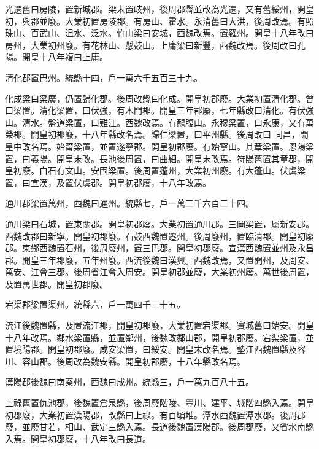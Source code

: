 \begin{pinyinscope}
 光遷舊曰房陵，置新城郡。梁末置岐州，後周郡縣並改為光遷，又有舊綏州，開皇初，與郡並廢。大業初置房陵郡。有房山、霍水。永清舊曰大洪，後周改焉。有照珠山、百武山、沮水、泛水。竹山梁曰安城，西魏改焉。置羅州。開皇十八年改曰房州，大業初州廢。有花林山、懸鼓山。上庸梁曰新豐，西魏改焉。後周改曰孔陽。開皇十八年複曰上庸。



 清化郡置巴州。統縣十四，戶一萬六千五百三十九。



 化成梁曰梁廣，仍置歸化郡。後周改縣曰化成。開皇初郡廢。大業初置清化郡。曾口梁置。清化梁置，曰伏強，有木門郡。開皇三年郡廢，七年縣改曰清化。有伏強山。清水。盤道梁置，曰難江。西魏改焉。有龍腹山。永穆梁置，曰永康，又有萬榮郡。開皇初郡廢，十八年縣改名焉。歸仁梁置，曰平州縣。後周改曰
 同昌，開皇中改名焉。始甯梁置，並置遂寧郡。開皇初郡廢。有始寧山。其章梁置。恩陽梁置，曰義陽。開皇末改。長池後周置，曰曲細。開皇末改焉。符陽舊置其章郡，開皇初廢。白石有文山。安固梁置。後周置蓬州，大業初州廢。有大蓬山。伏虞梁置，曰宣漢，及置伏虞郡。開皇初郡廢，十八年改焉。



 通川郡梁置萬州，西魏曰通州。統縣七，戶一萬二千六百二十四。



 通川梁曰石城，置東關郡。開皇初郡廢。大業初置通川郡。三岡梁置，屬新安郡。西魏改郡曰新寧。開皇初郡廢。石鼓西魏置遷州。後周廢州，置臨清郡。開皇初廢郡。東鄉西魏置石州，後周廢州，置三巴郡。開皇初郡廢。宣漢西魏置並州及永昌郡。開皇三年郡廢，五年州廢。西流後魏曰漢興。西魏改焉，又置開州，及周安、萬安、江會三郡。後周省江會入周安。開皇初郡並廢，大業初州廢。萬世後周置，及置萬世郡。開皇初郡廢。



 宕渠郡梁置渠州。統縣六，戶一萬四千三十五。



 流江後魏置縣，及置流江郡，開皇初郡廢，大業初置宕渠郡。賨城舊曰始安。開皇十八年改焉。鄰水梁置縣，並置鄰州，後魏改鄰山郡，開皇初郡廢。宕渠梁置，並置境陽郡。開皇初郡廢。咸安梁置，曰綏安。開皇末改名焉。墊江西魏置縣及容川、容山郡。後周改為魏安縣。開皇初郡廢，十八年縣改名焉。



 漢陽郡後魏曰南秦州，西魏曰成州。統縣三，戶一萬九百八十五。



 上祿舊置仇池郡，後魏置倉泉縣，後周廢階陵、豐川、建平、城階四縣入焉。開皇初郡廢，大業初置漢陽郡，改縣曰上祿。有百頃堆。潭水西魏置潭水郡。後周郡廢，並廢甘若，相山、武定三縣入焉。長道後魏置漢陽郡。後周郡廢，又省水南縣入焉。開皇初郡廢，十八年改曰長道。




\end{pinyinscope}
